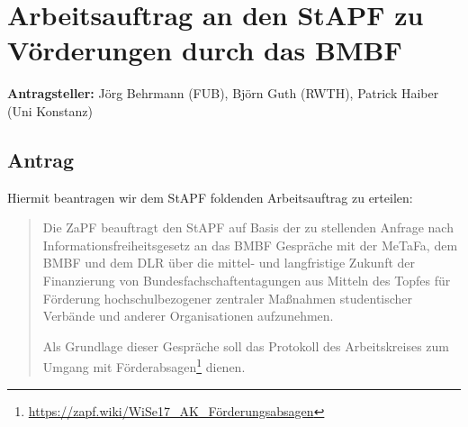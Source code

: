 \documentclass[draft,10pt,oneside]{scrartcl}
\begin{document}
\section*{Arbeitsauftrag an den StAPF zu Vörderungen durch das BMBF}

\textbf{Antragsteller:} Jörg Behrmann (FUB), Björn Guth (RWTH), Patrick Haiber
(Uni Konstanz)

\subsection*{Antrag}

Hiermit beantragen wir dem StAPF foldenden Arbeitsauftrag zu erteilen:

\begin{quote}
	Die ZaPF beauftragt den StAPF auf Basis der zu stellenden Anfrage nach
	Informationsfreiheitsgesetz an das BMBF Gespräche mit der MeTaFa, dem BMBF
	und dem DLR über die mittel- und langfristige Zukunft der Finanzierung von
	Bundesfachschaftentagungen aus Mitteln des Topfes für Förderung
	hochschulbezogener zentraler Maßnahmen studentischer Verbände und anderer
	Organisationen aufzunehmen.

	Als Grundlage dieser Gespräche soll das Protokoll des Arbeitskreises zum
	Umgang mit Förderabsagen\footnote{\href{https://zapf.wiki/WiSe17_AK_Förderungsabsagen}{\url{https://zapf.wiki/WiSe17_AK_Förderungsabsagen}}}
	dienen.
\end{quote}
\end{document}
